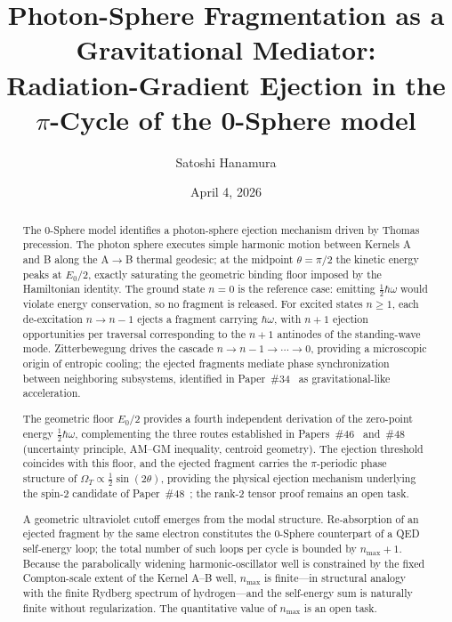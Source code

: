 \documentclass[%
 reprint, amsmath,amssymb, aps, prb, ]{revtex4-2}
\numberwithin{equation}{section}
\begin{document}
\title{Photon-Sphere Fragmentation as a Gravitational Mediator:\\
Radiation-Gradient Ejection in the $\pi$-Cycle of the 0-Sphere model}

\author{Satoshi Hanamura}
\date{April 4, 2026}

\begin{abstract}
The 0-Sphere model identifies a photon-sphere ejection mechanism driven by Thomas precession. The photon sphere executes simple harmonic motion between Kernels A and B along the A$\to$B thermal geodesic; at the midpoint $\theta=\pi/2$ the kinetic energy peaks at $E_0/2$, exactly saturating the geometric binding floor imposed by the Hamiltonian identity. The ground state $n=0$ is the reference case: emitting $\tfrac{1}{2}\hbar\omega$ would violate energy conservation, so no fragment is released. For excited states $n\geq1$, each de-excitation $n\to n-1$ ejects a fragment carrying $\hbar\omega$, with $n+1$ ejection opportunities per traversal corresponding to the $n+1$ antinodes of the standing-wave mode. Zitterbewegung drives the cascade $n\to n-1\to\cdots\to0$, providing a microscopic origin of entropic cooling; the ejected fragments mediate phase synchronization between neighboring subsystems, identified in Paper~\#34~\cite{hanamura34} as gravitational-like acceleration.

The geometric floor $E_0/2$ provides a fourth independent derivation of the zero-point energy $\tfrac{1}{2}\hbar\omega$, complementing the three routes established in Papers~\#46~\cite{hanamura46} and~\#48~\cite{hanamura48} (uncertainty principle, AM--GM inequality, centroid geometry). The ejection threshold coincides with this floor, and the ejected fragment carries the $\pi$-periodic phase structure of $\Omega_T\propto\tfrac{1}{2}\sin(2\theta)$, providing the physical ejection mechanism underlying the spin-2 candidate of Paper~\#48~\cite{hanamura48}; the rank-2 tensor proof remains an open task.

A geometric ultraviolet cutoff emerges from the modal structure. Re-absorption of an ejected fragment by the same electron constitutes the 0-Sphere counterpart of a QED self-energy loop; the total number of such loops per cycle is bounded by $n_{\max}+1$. Because the parabolically widening harmonic-oscillator well is constrained by the fixed Compton-scale extent of the Kernel A--B well, $n_{\max}$ is finite---in structural analogy with the finite Rydberg spectrum of hydrogen---and the self-energy sum is naturally finite without regularization. The quantitative value of $n_{\max}$ is an open task.
\end{abstract}
\end{document}
